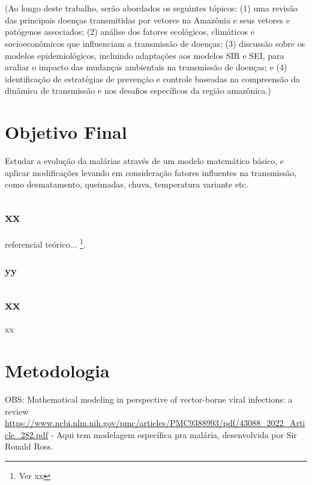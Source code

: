 \documentclass[12pt]{article}
\begin{document}
\\\\
(Ao longo deste trabalho, serão abordados os seguintes tópicos: (1) uma revisão das principais doenças transmitidas por vetores na Amazônia e seus vetores e patógenos associados; (2) análise dos fatores ecológicos, climáticos e socioeconômicos que influenciam a transmissão de doenças; (3) discussão sobre os modelos epidemiológicos, incluindo adaptações aos modelos SIR e SEI, para avaliar o impacto das mudanças ambientais na transmissão de doenças; e (4) identificação de estratégias de prevenção e controle baseadas na compreensão da dinâmica de transmissão e nos desafios específicos da região amazônica.)

\newpage
\section{Objetivo Final}

Estudar a evolução da malárias através de um modelo matemático básico, e aplicar modificações levando em consideração fatores influentes na transmissão, como desmatamento, queimadas, chuva, temperatura variante etc.

\subsection{xx}

referencial teórico... \footnote{Ver xx}.

\subsubsection{yy}

\newpage
\subsection{xx}

xx

\newpage
\section{Metodologia}

OBS: Mathematical modeling in perspective of vector-borne viral infections: a review
\href{https://www.ncbi.nlm.nih.gov/pmc/articles/PMC9388993/pdf/43088\_2022\_Article\_282.pdf}{https://www.ncbi.nlm.nih.gov/pmc/articles/PMC9388993/pdf/43088\_2022\_Article\_282.pdf} - Aqui tem modelagem específica pra malária, desenvolvida por Sir Ronald Ross.
\end{document}
